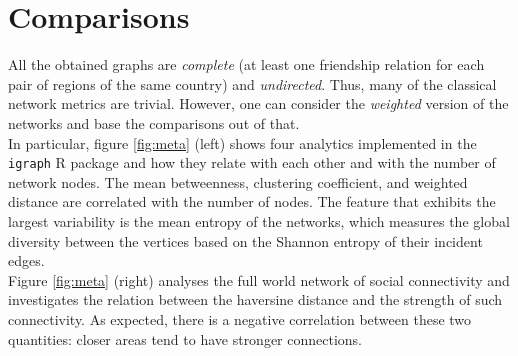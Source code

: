 \section{Comparisons}
All the obtained graphs are \emph{complete} (at least one friendship relation for each pair of regions of the same country) and \emph{undirected}. Thus, many of the classical network metrics are trivial. However, one can consider the \emph{weighted} version of the networks and base the comparisons out of that. \\ 
In particular, figure \ref{fig:meta} (left) shows four analytics implemented in the \texttt{igraph} R package and how they relate with each other and with the number of network nodes. The mean betweenness, clustering coefficient, and weighted distance are correlated with the number of nodes. The feature that exhibits the largest variability is the mean entropy of the networks, which measures the global diversity between the vertices based on the Shannon entropy of their incident edges. \\
Figure \ref{fig:meta} (right) analyses the full world network of social connectivity and investigates the relation between the haversine distance and the strength of such connectivity. As expected, there is a negative correlation between these two quantities: closer areas tend to have stronger connections. 


